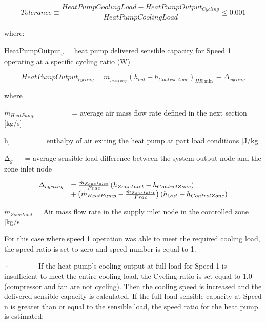\begin{equation}
  Tolerance \equiv \frac{HeatPumpCoolingLoad - HeatPumpOutput_{Cycling}}{HeatPumpCoolingLoad} \leq 0.001
\end{equation}

where:

HeatPumpOutput\(_{g}\) = heat pump delivered sensible capacity for Speed 1 operating at a specific cycling ratio (W)

\begin{equation}
HeatPumpOutpu{t_{cycling}} = {\dot m_{_{HeatPump}}}{\left( {{h_{out}} - {h_{Control\;Zone}}} \right)_{HR\min }} - {\Delta_{cycling}}
\end{equation}

where

\({\dot m_{HeatPump}}\) ~~~~~~~~~ = average air mass flow rate defined in the next section {[}kg/s{]}

h\(_{,}\) ~~~~~ ~ = enthalpy of air exiting the heat pump at part load conditions {[}J/kg{]}

Δ\(_{g}\) ~~ = average sensible load difference between the system output node and the zone inlet node

\begin{equation}
  \begin{array}{rl}
    \Delta_{cycling} &= \frac{\dot{m}_{ZoneInlet}}{Frac} \PB{h_{ZoneInlet}-h_{ControlZone}} \\
                           &+ \PB{\dot{m}_{HeatPump} - \frac{\dot{m}_{ZoneInlet}}{Frac}} \PB{h_{Out} - h_{ControlZone}}
  \end{array}
\end{equation}

\({{{\dot m}_{ZoneInlet}}}\) = Air mass flow rate in the supply inlet node in the controlled zone {[}kg/s{]}

For this case where speed 1 operation was able to meet the required cooling load, the speed ratio is set to zero and speed number is equal to 1.

·~~~~~~~~If the heat pump's cooling output at full load for Speed 1 is insufficient to meet the entire cooling load, the Cycling ratio is set equal to 1.0 (compressor and fan are not cycling). Then the cooling speed is increased and the delivered sensible capacity is calculated. If the full load sensible capacity at Speed n is greater than or equal to the sensible load, the speed ratio for the heat pump is estimated:

